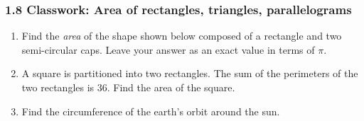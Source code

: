 

\fancyhead[LE]{\thepage}



\subsubsection*{1.8 Classwork: Area of rectangles, triangles, parallelograms}
\begin{enumerate}

\item Find the \emph{area} of the shape shown below composed of a rectangle and two semi-circular caps. Leave your answer as an exact value in terms of $\pi$.
\begin{flushright}
\end{flushright}




\newpage
\item A square is partitioned into two rectangles. The sum of the perimeters of the two rectangles is 36. Find the area of the square.
\begin{flushright}
\end{flushright}


\item Find the circumference of the earth's orbit around the sun. \vspace{2cm}


\end{enumerate}
